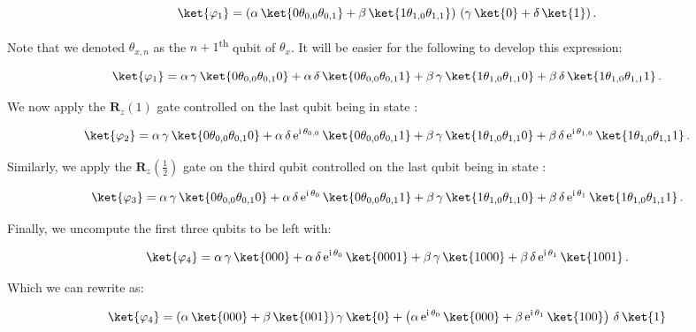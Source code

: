 \documentclass[11pt, a4paper]{article}
\begin{document}
                \[\ket{\varphi_1} = \left(\alpha\,\ket{0\theta_{0,0}\theta_{0,1}} + \beta\,\ket{1\theta_{1,0}\theta_{1,1}}\right)\,(\gamma\,\ket{0} + \delta\,\ket{1})\,.\]
                
                Note that we denoted \(\theta_{x, n}\) as the \(n+1\)\textsuperscript{th} qubit of \(\theta_x\). It will be easier for the following to develop this expression:
                
                \[\ket{\varphi_1} = \alpha\,\gamma\,\ket{0\theta_{0,0}\theta_{0,1}0} + \alpha\,\delta\,\ket{0\theta_{0,0}\theta_{0,1}1} + \beta\,\gamma\,\ket{1\theta_{1,0}\theta_{1,1}0} + \beta\,\delta\,\ket{1\theta_{1,0}\theta_{1,1}1}\,.\]
                
                We now apply the \(\mathbf{R}_z(1)\) gate controlled on the last qubit being in state :
                
                \[\ket{\varphi_2} = \alpha\,\gamma\,\ket{0\theta_{0,0}\theta_{0,1}0} + \alpha\,\delta\,\mathrm{e}^{\mathrm{i}\,\theta_{0,0}}\,\ket{0\theta_{0,0}\theta_{0,1}1} + \beta\,\gamma\,\ket{1\theta_{1,0}\theta_{1,1}0} + \beta\,\delta\,\mathrm{e}^{\mathrm{i}\,\theta_{1,0}}\,\ket{1\theta_{1,0}\theta_{1,1}1}\,.\]
                
                Similarly, we apply the \(\mathbf{R}_z\left(\frac12\right)\) gate on the third qubit controlled on the last qubit being in state :
                
                \[\ket{\varphi_3} = \alpha\,\gamma\,\ket{0\theta_{0,0}\theta_{0,1}0} + \alpha\,\delta\,\mathrm{e}^{\mathrm{i}\,\theta_{0}}\,\ket{0\theta_{0,0}\theta_{0,1}1} + \beta\,\gamma\,\ket{1\theta_{1,0}\theta_{1,1}0} + \beta\,\delta\,\mathrm{e}^{\mathrm{i}\,\theta_{1}}\,\ket{1\theta_{1,0}\theta_{1,1}1}\,.\]
                
                Finally, we uncompute the first three qubits to be left with:
                
                \[\ket{\varphi_4} = \alpha\,\gamma\,\ket{000} + \alpha\,\delta\,\mathrm{e}^{\mathrm{i}\,\theta_{0}}\,\ket{0001} + \beta\,\gamma\,\ket{1000} + \beta\,\delta\,\mathrm{e}^{\mathrm{i}\,\theta_{1}}\,\ket{1001}\,.\]
                
                Which we can rewrite as:
                
                \[\ket{\varphi_4} = (\alpha\,\ket{000} + \beta\,\ket{001})\,\gamma\,\ket{0} + \left(\alpha\,\mathrm{e}^{\mathrm{i}\,\theta_0}\,\ket{000}+\beta\,\mathrm{e}^{\mathrm{i}\,\theta_1}\,\ket{100}\right)\,\delta\,\ket{1}\]
                
\end{document}
